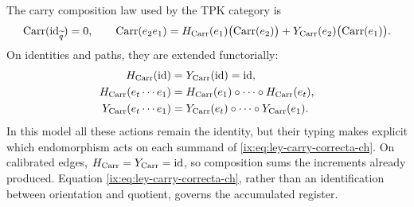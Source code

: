 The carry composition law used by the TPK category is
\begin{equation}
 \operatorname{Carr}(\operatorname{id}_{\widetilde q})=0,\qquad
 \operatorname{Carr}(e_2e_1)
 =H_{\rm Carr}(e_1)\bigl(\operatorname{Carr}(e_2)\bigr)
  +Y_{\rm Carr}(e_2)\bigl(\operatorname{Carr}(e_1)\bigr).
 \label{ix:eq:ley-carry-correcta-ch}
\end{equation}
On identities and paths, they are extended functorially:
\[
\begin{aligned}
 H_{\rm Carr}(\operatorname{id})
   &=Y_{\rm Carr}(\operatorname{id})=\operatorname{id},\\
 H_{\rm Carr}(e_t\cdots e_1)
   &=H_{\rm Carr}(e_1)\circ\cdots\circ H_{\rm Carr}(e_t),\\
 Y_{\rm Carr}(e_t\cdots e_1)
   &=Y_{\rm Carr}(e_t)\circ\cdots\circ Y_{\rm Carr}(e_1).
\end{aligned}
\]
In this model all these actions remain the identity, but
their typing makes explicit which endomorphism acts on each summand of
\eqref{ix:eq:ley-carry-correcta-ch}.
On calibrated edges, \(H_{\rm Carr}=Y_{\rm Carr}=\operatorname{id}\),
so composition sums the increments already produced. Equation
\eqref{ix:eq:ley-carry-correcta-ch}, rather than an identification between orientation and
quotient, governs the accumulated register.

